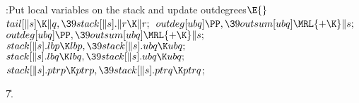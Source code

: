 \B{}:Put local variables on the stack and update outdegrees\X${}\E{}$\6
$\\{tail}[\|s]\K\|q,\39\\{stack}[\|s].\|r\K\|r;{}$\6
${}\\{outdeg}[\\{ubq}]\PP,\39\\{outsum}[\\{ubq}]\MRL{+{\K}}\|s;{}$\6
${}\\{outdeg}[\\{ubq}]\PP,\39\\{outsum}[\\{ubq}]\MRL{+{\K}}\|s;{}$\6
${}\\{stack}[\|s].\\{lbp}\K\\{lbp},\39\\{stack}[\|s].\\{ubq}\K\\{ubq};{}$\6
${}\\{stack}[\|s].\\{lbq}\K\\{lbq},\39\\{stack}[\|s].\\{ubq}\K\\{ubq};{}$\6
${}\\{stack}[\|s].\\{ptrp}\K\\{ptrp},\39\\{stack}[\|s].\\{ptrq}\K\\{ptrq}{}$;%
\par
\U7.\fi


